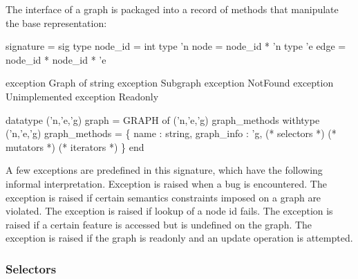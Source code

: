 The interface of a graph is packaged into a 
record of methods that manipulate the base representation:  
\begin{SML}
 signature  = sig
   type node_id = int
   type 'n node = node_id * 'n 
   type 'e edge = node_id * node_id * 'e

   exception Graph of string
   exception Subgraph        
   exception NotFound        
   exception Unimplemented        
   exception Readonly        

   datatype ('n,'e,'g) graph = GRAPH of ('n,'e,'g) graph_methods
   withtype ('n,'e,'g) graph_methods = 
       \{  name            : string,
          graph_info      : 'g,
          (* selectors *)
          (* mutators *)
          (* iterators *)
       \}
 end
\end{SML}

A few exceptions are predefined in this signature, which have
the following informal interpretation.
Exception  is raised when a bug is encountered.
The exception  is raised if certain semantics constraints
imposed on a graph are violated.
The exception  is raised if lookup of a node id fails.
The exception  is raised if a certain feature
is accessed but is undefined on the graph.  The exception 
 is raised if the graph is readonly and an update operation
is attempted.

\subsubsection{Selectors}

